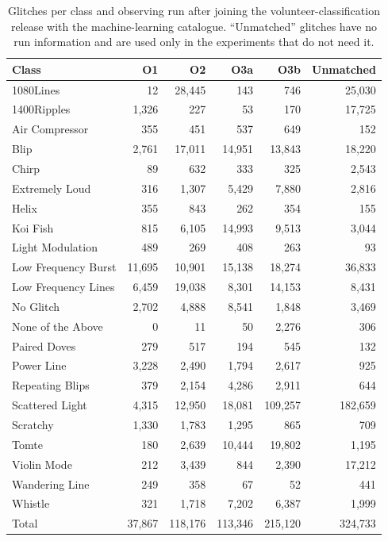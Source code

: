 \begin{table}[!htbp]
\caption{Glitches per class and observing run after joining the volunteer-classification release with the
machine-learning catalogue. ``Unmatched'' glitches have no run information and are used only in the experiments that do not need it.}\label{tab:data}
\centering\footnotesize\setlength{\tabcolsep}{4pt}
\begin{tabular}{lrrrrr}\toprule
Class & O1 & O2 & O3a & O3b & Unmatched\\\midrule
1080Lines & 12 & 28,445 & 143 & 746 & 25,030 \\
1400Ripples & 1,326 & 227 & 53 & 170 & 17,725 \\
Air Compressor & 355 & 451 & 537 & 649 & 152 \\
Blip & 2,761 & 17,011 & 14,951 & 13,843 & 18,220 \\
Chirp & 89 & 632 & 333 & 325 & 2,543 \\
Extremely Loud & 316 & 1,307 & 5,429 & 7,880 & 2,816 \\
Helix & 355 & 843 & 262 & 354 & 155 \\
Koi Fish & 815 & 6,105 & 14,993 & 9,513 & 3,044 \\
Light Modulation & 489 & 269 & 408 & 263 & 93 \\
Low Frequency Burst & 11,695 & 10,901 & 15,138 & 18,274 & 36,833 \\
Low Frequency Lines & 6,459 & 19,038 & 8,301 & 14,153 & 8,431 \\
No Glitch & 2,702 & 4,888 & 8,541 & 1,848 & 3,469 \\
None of the Above & 0 & 11 & 50 & 2,276 & 306 \\
Paired Doves & 279 & 517 & 194 & 545 & 132 \\
Power Line & 3,228 & 2,490 & 1,794 & 2,617 & 925 \\
Repeating Blips & 379 & 2,154 & 4,286 & 2,911 & 644 \\
Scattered Light & 4,315 & 12,950 & 18,081 & 109,257 & 182,659 \\
Scratchy & 1,330 & 1,783 & 1,295 & 865 & 709 \\
Tomte & 180 & 2,639 & 10,444 & 19,802 & 1,195 \\
Violin Mode & 212 & 3,439 & 844 & 2,390 & 17,212 \\
Wandering Line & 249 & 358 & 67 & 52 & 441 \\
Whistle & 321 & 1,718 & 7,202 & 6,387 & 1,999 \\
\midrule
Total & 37,867 & 118,176 & 113,346 & 215,120 & 324,733 \\\bottomrule
\end{tabular}
\end{table}
